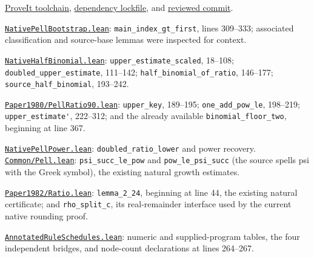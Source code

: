 \documentclass[11pt,a4paper]{article}
\newcommand{\code}[1]{\nolinkurl{#1}}
\newcommand{\src}[2]{\href{https://github.com/VladimirReshetnikov/ProveIt/blob/9bd29079d5e1c6cc1c0bcaee6cb57d59b835cba9/#1}{#2}}
\begin{document}
\begin{enumerate}[label={[\arabic*]},leftmargin=9mm]
\item\label{ref:baseline}
\src{lean-toolchain}{ProveIt toolchain},
\src{lake-manifest.json}{dependency lockfile}, and
\href{https://github.com/VladimirReshetnikov/ProveIt/commit/9bd29079d5e1c6cc1c0bcaee6cb57d59b835cba9}{reviewed commit}.

\item\label{ref:bootstrap}
\src{Computability/DiophantineConsistency/Lean/DiophantineConsistency/NativePellBootstrap.lean}{\code{NativePellBootstrap.lean}}:
\code{main_index_gt_first}, lines 309--333; associated classification and
source-base lemmas were inspected for context.

\item\label{ref:half}
\src{Computability/DiophantineConsistency/Lean/DiophantineConsistency/NativeHalfBinomial.lean}{\code{NativeHalfBinomial.lean}}:
\code{upper_estimate_scaled}, 18--108;
\code{doubled_upper_estimate}, 111--142;
\code{half_binomial_of_ratio}, 146--177;
\code{source_half_binomial}, 193--242.

\item\label{ref:ratio}
\src{Computability/HilbertTenthProblem/Lean/Diophantine/Paper1980/PellRatio90.lean}{\code{Paper1980/PellRatio90.lean}}:
\code{upper_key}, 189--195;
\code{one_add_pow_le}, 198--219;
\code{upper_estimate'}, 222--312; and the already available
\code{binomial_floor_two}, beginning at line 367.

\item\label{ref:lower}
\src{Computability/DiophantineConsistency/Lean/DiophantineConsistency/NativePellPower.lean}{\code{NativePellPower.lean}}:
\code{doubled_ratio_lower} and power recovery.
\src{Computability/HilbertTenthProblem/Lean/Diophantine/Common/Pell.lean}{\code{Common/Pell.lean}}:
\code{psi_succ_le_pow} and \code{pow_le_psi_succ} (the source spells psi with
the Greek symbol), the existing natural growth estimates.

\item\label{ref:binomial}
\src{Computability/HilbertTenthProblem/Lean/Diophantine/Paper1982/Ratio.lean}{\code{Paper1982/Ratio.lean}}:
\code{lemma_2_24}, beginning at line 44, the existing natural certificate;
and \code{rho_split_c}, its real-remainder interface used by the current
native rounding proof.

\item\label{ref:schedules}
\src{Computability/DiophantineConsistency/Lean/DiophantineConsistency/AnnotatedRuleSchedules.lean}{\code{AnnotatedRuleSchedules.lean}}:
numeric and supplied-program tables, the four independent bridges, and
node-count declarations at lines 264--267.


\end{enumerate}
\end{document}
